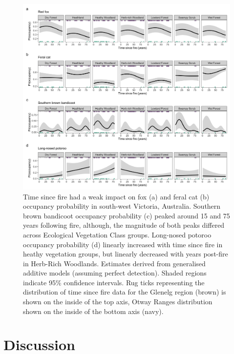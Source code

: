 \documentclass[11pt,a4paper,titlepage,twoside,openright]{style/unimelbthesis}
\begin{document}
\begin{mainmatter}
\(~\)
\begin{figure}

{\centering \includegraphics[width=1\linewidth]{figure/tsf} 

}

\caption{Time since fire had a weak impact on fox (a) and feral cat (b) occupancy probability in south-west Victoria, Australia. Southern brown bandicoot occupancy probability (c) peaked around 15 and 75 years following fire, although, the magnitude of both peaks differed across Ecological Vegetation Class groups. Long-nosed potoroo occupancy probability (d) linearly increased with time since fire in heathy vegetation groups, but linearly decreased with years post-fire in Herb-Rich Woodlands. Estimates derived from generalised additive models (assuming perfect detection). Shaded regions indicate 95\% confidence intervals. Rug ticks representing the distribution of time since fire data for the Glenelg region (brown) is shown on the inside of the top axis, Otway Ranges distribution shown on the inside of the bottom axis (navy).}\label{fig:occ-tsf}
\end{figure}
\newpage

\hypertarget{discussion-1}{%
\section{Discussion}\label{discussion-1}}


\end{mainmatter}
\end{document}
